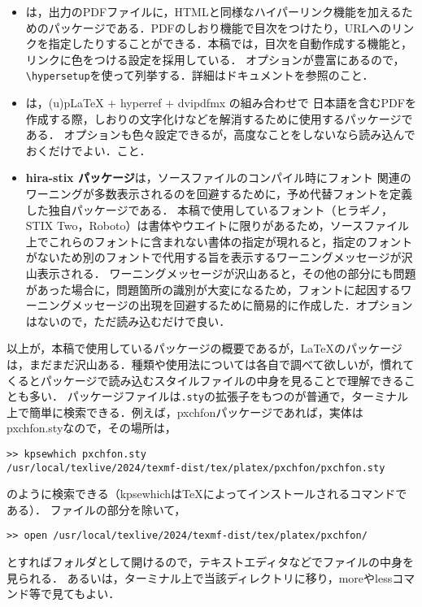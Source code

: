 \begin{itemize}
\item{}は，出力のPDFファイルに，HTMLと同様なハイパーリンク機能を加えるためのパッケージである\cite{hyperref}．PDFのしおり機能で目次をつけたり，URLへのリンクを指定したりすることができる．本稿では，目次を自動作成する機能と，リンクに色をつける設定を採用している．
オプションが豊富にあるので，\verb|\hypersetup|を使って列挙する．詳細はドキュメントを参照のこと．

\item{}は，(u){p\LaTeX} $+$ hyperref $+$ dvipdfmx の組み合わせで
日本語を含むPDFを作成する際，しおりの文字化けなどを解消するために使用するパッケージである\cite{pxjahyper}．
オプションも色々設定できるが，高度なことをしないなら読み込んでおくだけでよい．こと．

\item{\sffamily\bfseries hira-stix パッケージ}は，ソースファイルのコンパイル時にフォント
関連のワーニングが多数表示されるのを回避するために，予め代替フォントを定義した独自パッケージである．
本稿で使用しているフォント（ヒラギノ，STIX Two，Roboto）は書体やウエイトに限りがあるため，ソースファイル上でこれらのフォントに含まれない書体の指定が現れると，指定のフォントがないため別のフォントで代用する旨を表示するワーニングメッセージが沢山表示される．
ワーニングメッセージが沢山あると，その他の部分にも問題があった場合に，問題箇所の識別が大変になるため，フォントに起因するワーニングメッセージの出現を回避するために簡易的に作成した．オプションはないので，ただ読み込むだけで良い．
\end{itemize}

以上が，本稿で使用しているパッケージの概要であるが，{\LaTeX}のパッケージは，まだまだ沢山ある．種類や使用法については各自で調べて欲しいが，慣れてくるとパッケージで読み込むスタイルファイルの中身を見ることで理解できることも多い．
パッケージファイルは\texttt{.sty}の拡張子をもつのが普通で，ターミナル上で簡単に検索できる．例えば，pxchfonパッケージであれば，実体はpxchfon.styなので，その場所は，
\begin{tcolorbox}[colback=blue!5!white,colframe=blue!70!black]
\begin{verbatim}
>> kpsewhich pxchfon.sty
/usr/local/texlive/2024/texmf-dist/tex/platex/pxchfon/pxchfon.sty
\end{verbatim}
\end{tcolorbox}
\noindent
のように検索できる（kpsewhichは{\TeX}によってインストールされるコマンドである）．
ファイルの部分を除いて，
\begin{tcolorbox}[colback=blue!5!white,colframe=blue!70!black]
\begin{verbatim}
>> open /usr/local/texlive/2024/texmf-dist/tex/platex/pxchfon/
\end{verbatim}
\end{tcolorbox}
\noindent
とすればフォルダとして開けるので，テキストエディタなどでファイルの中身を見られる．
あるいは，ターミナル上で当該ディレクトリに移り，moreやlessコマンド等で見てもよい．

